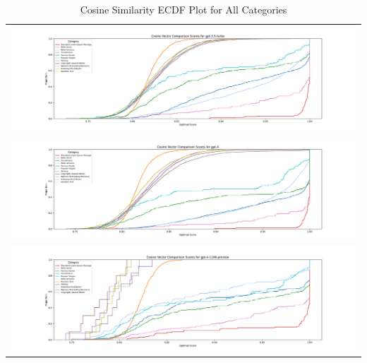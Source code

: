 \documentclass{article}
\begin{document}
\begin{table}[ht] 
\centering 
\begin{tabular}{c} 
\includegraphics[width=1.0\textwidth]{plots/cosine-ecdf-plot-gpt-3.5-turbo.png}  \\  
\includegraphics[width=1.0\textwidth]{plots/cosine-ecdf-plot-gpt-4.png}  \\ 
\includegraphics[width=1.0\textwidth]{plots/cosine-ecdf-plot-gpt-4-1106-preview.png}  \\ 
\end{tabular} 
\caption{Cosine Similarity ECDF Plot for All Categories} 
\label{tab:images} 
\end{table} 

\end{document}
